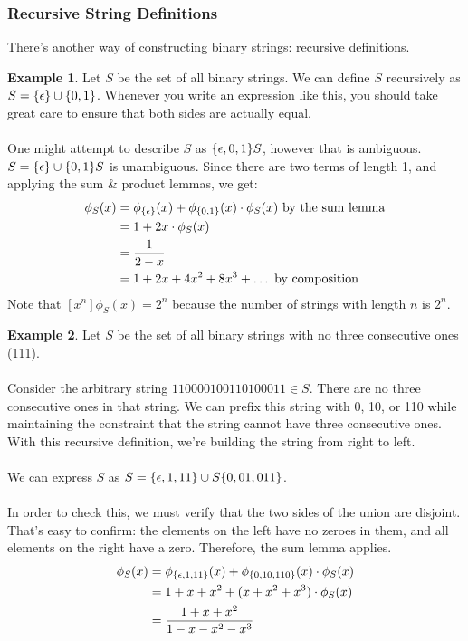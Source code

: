 \documentclass[]{article}
\theoremstyle{definition}
\newtheorem{ex}{Example}[section]
\newcommand{\lecture}[1]{\marginpar{{\footnotesize $\leftarrow$ \underline{#1}}}}
\DeclarePairedDelimiter{\set}{\lbrace}{\rbrace}
\begin{document}
			\subsubsection{Recursive String Definitions}
				There's another way of constructing binary strings: recursive definitions.
				\begin{ex} \lecture{February 1, 2013}
					Let $S$ be the set of all binary strings. We can define $S$ recursively as $S = \set{\epsilon } \cup \set{0, 1}$. Whenever you write an expression like this, you should take great care to ensure that both sides are actually equal.
					\\ \\
					One might attempt to describe $S$ as $\set{\epsilon, 0, 1 }S$, however that is ambiguous. $S = \set{\epsilon } \cup \set{0, 1 } S$ is unambiguous. Since there are two terms of length 1, and applying the sum \& product lemmas, we get:
					\begin{align*}
						\phi_S(x) &= \phi_{\set{\epsilon}}(x) + \phi_{\set{0, 1}}(x) \cdot \phi_S(x) \text{ by the sum lemma} \\
						&= 1 + 2x \cdot \phi_S(x) \\
						&= \frac{1}{2 - x} \\
						&= 1 + 2x + 4x^2 + 8x^3 + \ldots \text{ by composition}
					\end{align*}
					Note that $[x^n]\phi_S(x) = 2^n$ because the number of strings with length $n$ is $2^n$.
				\end{ex}

				\begin{ex}
					Let $S$ be the set of all binary strings with no three consecutive ones (111).
					\\ \\
					Consider the arbitrary string $110000100110100011 \in S$. There are no three consecutive ones in that string. We can prefix this string with 0, 10, or 110 while maintaining the constraint that the string cannot have three consecutive ones. With this recursive definition, we're building the string from right to left.
					\\ \\
					We can express $S$ as $S = \set{\epsilon, 1, 11 } \cup S\set{0, 01, 011}$.
					\\ \\
					In order to check this, we must verify that the two sides of the union are disjoint. That's easy to confirm: the elements on the left have no zeroes in them, and all elements on the right have a zero. Therefore, the sum lemma applies.
					\begin{align*}
						\phi_S(x) &= \phi_{\set{\epsilon, 1, 11}}(x) + \phi_{\set{0, 10, 110}}(x) \cdot \phi_S(x) \\
						&= 1 + x + x^2 + (x + x^2 + x^3) \cdot \phi_S(x) \\
						&= \frac{1 + x + x^2}{1 - x - x^2 - x^3}
					\end{align*}
				\end{ex}
\end{document}
